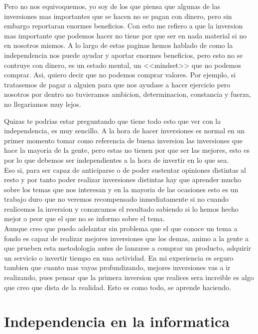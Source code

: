 Pero no nos equivoquemos, yo soy de los que piensa que algunas de las inversiones mas importantes que se hacen no se pagan con dinero, pero sin embargo reportaran enormes beneficios. Con esto me refiero a que la inversion mas importante que podemos hacer no tiene por que ser en nada material si no en nosotros mismos. A lo largo de estas paginas hemos hablado de como la independencia nos puede ayudar y aportar enormes beneficios, pero esto no se contruye con dinero, es un estado mental, un <<mindset>> que no podemos comprar. Asi, quiero decir que no podemos comprar valores. Por ejemplo, si tratasemos de pagar a alguien para que nos ayudase a hacer ejercicio pero nosotros por dentro no tuvieramos ambicion, determinacion, constancia y fuerza, no llegariamos muy lejos. 

Quizas te podrias estar preguntando que tiene todo esto que ver con la independencia, es muy sencillo. A la hora de hacer inversiones es normal en un primer momento tomar como referencia de buena inversion las inversiones que hace la mayoria de la gente, pero estas no tienen por que ser las mejores, esto es por lo que debemos ser independientes a la hora de invertir en lo que sea.\\

Eso si, para ser capaz de anticiparse o de poder sustentar opiniones distintas al resto y por tanto poder realizar inversiones distintas hay que aprender mucho sobre los temas que nos interesan y en la mayoria de las ocasiones esto es un trabajo duro que no veremos recompensado inmediatamente si no cuando realicemos la inversion y conozcamos el resultado sabiendo si lo hemos hecho mejor o peor que el que no se informo sobre el tema.\\

Aunque creo que puedo adelantar sin problema que el que conoce un tema a fondo es capaz de realizar mejores inversiones que los demas, animo a la gente a que prueben esta metodologia antes de lanzarse a comprar un producto, adquirir un servicio o invertir tiempo en una actividad. En mi experiencia es seguro tambien que cuanto mas vayas profundizando, mejores inversiones vas a ir realizando, pues pensar que la primera inversion que realices sera increible es algo que creo que dista de la realidad. Esto es como todo, se aprende haciendo.

\section{Independencia en la informatica}


